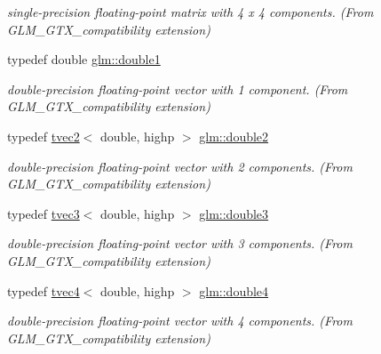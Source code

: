 \begin{DoxyCompactItemize}
\begin{DoxyCompactList}\small\item\em single-\/precision floating-\/point matrix with 4 x 4 components. (From G\+L\+M\+\_\+\+G\+T\+X\+\_\+compatibility extension) \end{DoxyCompactList}\item 
\mbox{\label{group__gtx__compatibility_gab8b88350212cea916857cb2f49b8a29f}} 
typedef double \hyperlink{group__gtx__compatibility_gab8b88350212cea916857cb2f49b8a29f}{glm\+::double1}
\begin{DoxyCompactList}\small\item\em double-\/precision floating-\/point vector with 1 component. (From G\+L\+M\+\_\+\+G\+T\+X\+\_\+compatibility extension) \end{DoxyCompactList}\item 
\mbox{\label{group__gtx__compatibility_ga490652005dad57a41887b974195f36c1}} 
typedef \hyperlink{structglm_1_1tvec2}{tvec2}$<$ double, highp $>$ \hyperlink{group__gtx__compatibility_ga490652005dad57a41887b974195f36c1}{glm\+::double2}
\begin{DoxyCompactList}\small\item\em double-\/precision floating-\/point vector with 2 components. (From G\+L\+M\+\_\+\+G\+T\+X\+\_\+compatibility extension) \end{DoxyCompactList}\item 
\mbox{\label{group__gtx__compatibility_ga80c4961ce61e918f21c1546d43aea2f0}} 
typedef \hyperlink{structglm_1_1tvec3}{tvec3}$<$ double, highp $>$ \hyperlink{group__gtx__compatibility_ga80c4961ce61e918f21c1546d43aea2f0}{glm\+::double3}
\begin{DoxyCompactList}\small\item\em double-\/precision floating-\/point vector with 3 components. (From G\+L\+M\+\_\+\+G\+T\+X\+\_\+compatibility extension) \end{DoxyCompactList}\item 
\mbox{\label{group__gtx__compatibility_ga43d433fc74b24a45801e2be74e7f6fca}} 
typedef \hyperlink{structglm_1_1tvec4}{tvec4}$<$ double, highp $>$ \hyperlink{group__gtx__compatibility_ga43d433fc74b24a45801e2be74e7f6fca}{glm\+::double4}
\begin{DoxyCompactList}\small\item\em double-\/precision floating-\/point vector with 4 components. (From G\+L\+M\+\_\+\+G\+T\+X\+\_\+compatibility extension) \end{DoxyCompactList}\item 

\end{DoxyCompactItemize}
